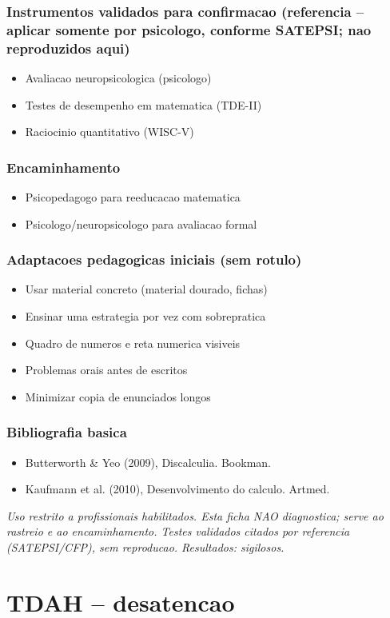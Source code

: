 \documentclass[a4paper,11pt]{book}
\newcommand{\avisolegal}{\par\medskip\noindent\footnotesize\itshape
\color{cinza}Uso restrito a profissionais habilitados. Esta ficha NAO diagnostica;
serve ao rastreio e ao encaminhamento. Testes validados citados por referencia
(SATEPSI/CFP), sem reproducao. Resultados: sigilosos.\color{black}\par}
\begin{document}
\subsection*{Instrumentos validados para confirmacao (referencia -- aplicar somente por psicologo, conforme SATEPSI; nao reproduzidos aqui)}
\begin{itemize}
\item Avaliacao neuropsicologica (psicologo)
\item Testes de desempenho em matematica (TDE-II)
\item Raciocinio quantitativo (WISC-V)
\end{itemize}
\subsection*{Encaminhamento}
\begin{itemize}
\item Psicopedagogo para reeducacao matematica
\item Psicologo/neuropsicologo para avaliacao formal
\end{itemize}
\subsection*{Adaptacoes pedagogicas iniciais (sem rotulo)}
\begin{itemize}
\item Usar material concreto (material dourado, fichas)
\item Ensinar uma estrategia por vez com sobrepratica
\item Quadro de numeros e reta numerica visiveis
\item Problemas orais antes de escritos
\item Minimizar copia de enunciados longos
\end{itemize}
\subsection*{Bibliografia basica}
\begin{itemize}
\item Butterworth \& Yeo (2009), Discalculia. Bookman.
\item Kaufmann et al. (2010), Desenvolvimento do calculo. Artmed.
\end{itemize}
\avisolegal


\chapter{TDAH -- desatencao}
\end{document}

